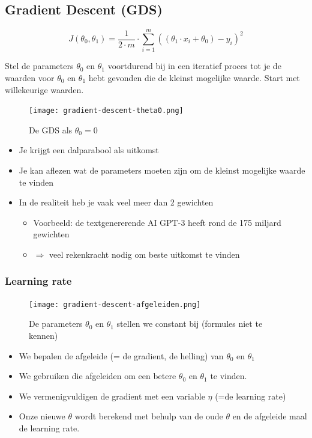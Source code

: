 \documentclass{article}
\begin{document}
\subsection{Gradient Descent (GDS)}

\begin{equation}
J(\theta_0, \theta_1) = \frac{1}{2\cdot m} \cdot \sum_{i=1}^m ((\theta_1\cdot x_i + \theta_0) - y_i)^2
\end{equation}

Stel de parameters $\theta_0$ en $\theta_1$ voortdurend bij in een iteratief proces 
tot je de waarden voor $\theta_0$ en $\theta_1$ hebt gevonden die de kleinst mogelijke waarde. Start met willekeurige waarden.

\begin{figure}[H]
    \centering
    \texttt{[image: gradient-descent-theta0.png]}
    \caption{De GDS als $\theta_0 = 0$}
\end{figure}

\begin{itemize}
    \item Je krijgt een dalparabool als uitkomst 
    \item Je kan aflezen wat de parameters moeten zijn om de kleinst mogelijke waarde te vinden
    \item In de realiteit heb je vaak veel meer dan 2 gewichten
    \begin{itemize}
        \item Voorbeeld: de textgenererende AI GPT-3 heeft rond de 175 miljard gewichten 
        \item $\Rightarrow$ veel rekenkracht nodig om beste uitkomst te vinden
    \end{itemize}
\end{itemize}

\subsubsection{Learning rate}

\begin{figure}[H]
    \centering
    \texttt{[image: gradient-descent-afgeleiden.png]}
    \caption{De parameters $\theta_0$ en $\theta_1$ stellen we constant bij (formules niet te kennen)}
\end{figure}

\begin{itemize}
    \item We bepalen de afgeleide (= de gradient, de helling) van $\theta_0$ en $\theta_1$
    \item We gebruiken die afgeleiden om een betere $\theta_0$ en $\theta_1$ te vinden.
    \item We vermenigvuldigen de gradient met een variable $\eta$ (=de learning rate)
    \item Onze nieuwe $\theta$ wordt berekend met behulp van de oude $\theta$ en de afgeleide maal de learning rate. 
\end{itemize}
\end{document}
